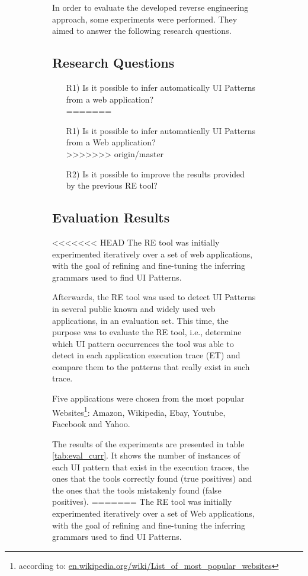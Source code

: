 \documentclass[conference]{IEEEtran}
\begin{document}
\begin{enumerate}
\begin{figure}[!htb]
\begin{itemize}
\begin{figure}[!htb]
\begin{itemize}
In order to evaluate the developed reverse engineering approach, some experiments were performed. They aimed to answer the following research questions.

\subsection{Research Questions}
\begin{itemize}
<<<<<<< HEAD
  \item[R1)] Is it possible to infer automatically UI Patterns from a web application?\\
=======
  \item[R1)] Is it possible to infer automatically UI Patterns from a Web application?\\
>>>>>>> origin/master
  \item[R2)] Is it possible to improve the results provided by the previous RE tool?\\
\end{itemize}

\subsection{Evaluation Results}

<<<<<<< HEAD
The RE tool was initially experimented iteratively over a set of web applications, with the goal of refining and fine-tuning the inferring grammars used to find UI Patterns.

Afterwards, the RE tool was used to detect UI Patterns in several public known and widely used web applications, in an evaluation set. This time, the purpose was to evaluate the RE tool, i.e., determine which UI pattern occurrences the tool was able to detect in each application execution trace (ET) and compare them to the patterns that really exist in such trace.

Five applications were chosen from the most popular Websites\footnote{according to: \url{en.wikipedia.org/wiki/List_of_most_popular_websites‎}}: Amazon, Wikipedia, Ebay, Youtube, Facebook and Yahoo.

The results of the experiments are presented in table \ref{tab:eval_curr}. It shows the number of instances of each UI pattern that exist in the execution traces, the ones that the tools correctly found (true positives) and the ones that the tools mistakenly found (false positives). 
=======
The RE tool was initially experimented iteratively over a set of Web applications, with the goal of refining and fine-tuning the inferring grammars used to find UI Patterns.


\end{itemize}
\end{figure}
\end{itemize}
\end{figure}
\end{enumerate}
\end{document}
